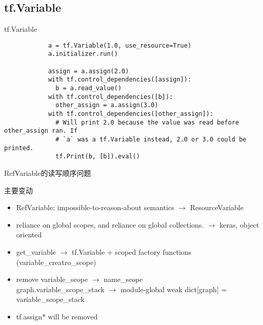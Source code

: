 
\subsection{tf.Variable}

\begin{frame}[fragile]{tf.Variable}
    \begin{listing}
        \begin{verbatim}
            a = tf.Variable(1.0, use_resource=True)
            a.initializer.run()

            assign = a.assign(2.0)
            with tf.control_dependencies([assign]):
              b = a.read_value()
            with tf.control_dependencies([b]):
              other_assign = a.assign(3.0)
            with tf.control_dependencies([other_assign]):
              # Will print 2.0 because the value was read before other_assign ran. If
              # `a` was a tf.Variable instead, 2.0 or 3.0 could be printed.
              tf.Print(b, [b]).eval()
        \end{verbatim}
        \caption{RefVariable的读写顺序问题}
    \end{listing}
\end{frame}

\begin{frame}{主要变动}
    \begin{itemize}
        \item RefVariable: impossible-to-reason-about semantics $\to$ ResourceVariable
        \item reliance on global scopes, and reliance on global collections. $\to$ keras, object oriented
        \item get\_variable  $\to$ tf.Variable + scoped factory functions (variable\_creatro\_scope)
        \item remove variable\_scope $\to$ name\_scope \\
            graph.variable\_scope\_stack $\to$ module-global weak dict[graph] = variable\_scope\_stack
        \item tf.assign* will be removed
    \end{itemize}
\end{frame}

